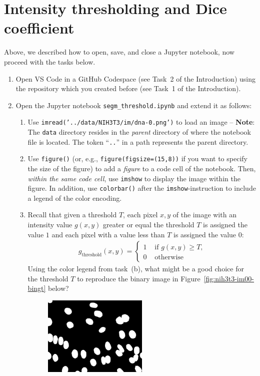 \documentclass[12pt,a4paper]{article}
\begin{document}
\section{Intensity thresholding and Dice coefficient}
\label{task:threshold_segm}

Above, we described how to open, save, and close a Jupyter notebook, now proceed with the tasks below.
\begin{enumerate}
    \item Open VS Code in a GitHub Codespace (see Task~2 of the Introduction) using the repository which you created before (see Task~1 of the Introduction).
    \item Open the Jupyter notebook \texttt{segm\_threshold.ipynb} and extend it as follows:
    \begin{enumerate}
        \item Use \texttt{imread('../data/NIH3T3/im/dna-0.png')} to load an image -- \textbf{Note}: The \texttt{data} directory resides in the \emph{parent} directory of where the notebook file is located. The token ``\texttt{..}'' in a path represents the parent directory.
        \item Use \texttt{figure()} (or, e.g., \texttt{figure(figsize=(15,8))} if you want to specify the size of the figure) to add a \emph{figure} to a code cell of the notebook. Then, \emph{within the same code cell}, use \texttt{imshow} to display the image within the figure. In addition, use \texttt{colorbar()} after the \texttt{imshow}-instruction to include a legend of the color encoding.
        \item Recall that given a threshold $T$, each pixel $x,y$ of the image with an intensity value $g\left(x,y\right)$ greater or equal the threshold $T$ is assigned the value $1$ and each pixel with a value less than $T$ is assigned the value $0$:
        \begin{align*}
            g_\text{threshold}\left(x,y\right) = \begin{cases}
                1 & \text{ if $g\left(x,y\right) \geq T$,} \\
                0 & \text{ otherwise}
            \end{cases}
        \end{align*}
        Using the color legend from task~(b), what might be a good choice for the threshold $T$ to reproduce the binary image in Figure~\ref{fig:nih3t3-im00-bingt} below?
        \begin{figure}[h!]
            \centering
            \includegraphics[width=0.5\textwidth]{images/nih3t3-im00-bingt.png}

\end{figure}
\end{enumerate}
\end{enumerate}
\end{document}
